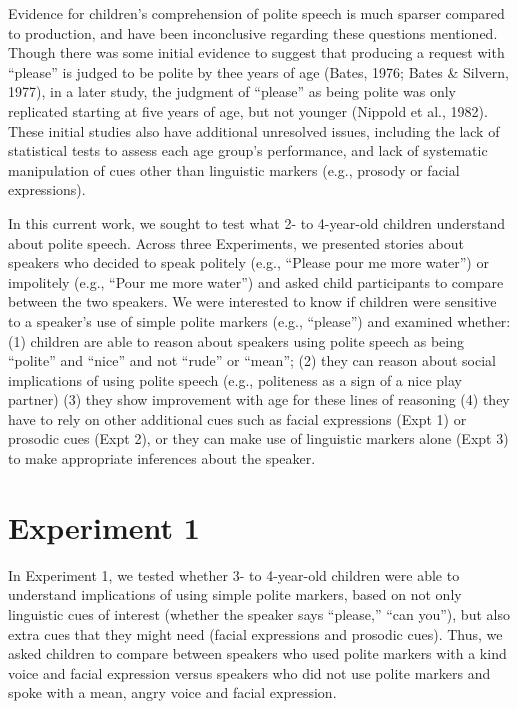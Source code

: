 \documentclass[10pt, letterpaper]{article}
\begin{document}
Evidence for children's comprehension of polite speech is much sparser
compared to production, and have been inconclusive regarding these
questions mentioned. Though there was some initial evidence to suggest
that producing a request with ``please'' is judged to be polite by thee
years of age (Bates, 1976; Bates \& Silvern, 1977), in a later study,
the judgment of ``please'' as being polite was only replicated starting
at five years of age, but not younger (Nippold et al., 1982). These
initial studies also have additional unresolved issues, including the
lack of statistical tests to assess each age group's performance, and
lack of systematic manipulation of cues other than linguistic markers
(e.g., prosody or facial expressions).

In this current work, we sought to test what 2- to 4-year-old children
understand about polite speech. Across three Experiments, we presented
stories about speakers who decided to speak politely (e.g., ``Please
pour me more water'') or impolitely (e.g., ``Pour me more water'') and
asked child participants to compare between the two speakers. We were
interested to know if children were sensitive to a speaker's use of
simple polite markers (e.g., ``please'') and examined whether: (1)
children are able to reason about speakers using polite speech as being
``polite'' and ``nice'' and not ``rude'' or ``mean''; (2) they can
reason about social implications of using polite speech (e.g.,
politeness as a sign of a nice play partner) (3) they show improvement
with age for these lines of reasoning (4) they have to rely on other
additional cues such as facial expressions (Expt 1) or prosodic cues
(Expt 2), or they can make use of linguistic markers alone (Expt 3) to
make appropriate inferences about the speaker.

\section{Experiment 1}\label{experiment-1}

In Experiment 1, we tested whether 3- to 4-year-old children were able
to understand implications of using simple polite markers, based on not
only linguistic cues of interest (whether the speaker says ``please,''
``can you''), but also extra cues that they might need (facial
expressions and prosodic cues). Thus, we asked children to compare
between speakers who used polite markers with a kind voice and facial
expression versus speakers who did not use polite markers and spoke with
a mean, angry voice and facial expression.
\end{document}
